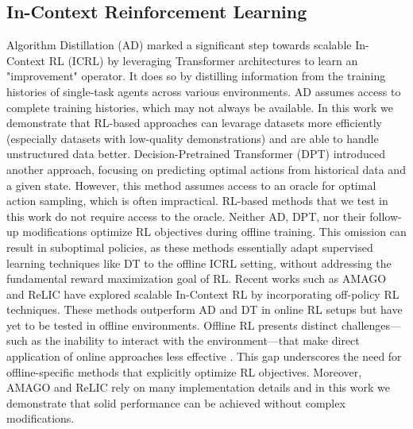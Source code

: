 \documentclass{article}
\begin{document}
\subsection{In-Context Reinforcement Learning}
Algorithm Distillation (AD) \citep{laskin2022context} marked a significant step towards scalable In-Context RL (ICRL) by leveraging Transformer architectures to learn an "improvement" operator. It does so by distilling information from the training histories of single-task agents across various environments. AD assumes access to complete training histories, which may not always be available. In this work we demonstrate that RL-based approaches can levarage datasets more efficiently (especially datasets with low-quality demonstrations) and are able to handle unstructured data better.
Decision-Pretrained Transformer (DPT) \citep{lee2024supervised} introduced another approach, focusing on predicting optimal actions from historical data and a given state. However, this method assumes access to an oracle for optimal action sampling, which is often impractical. RL-based methods that we test in this work do not require access to the oracle.
Neither AD, DPT, nor their follow-up modifications \citep{sinii2023context, schmied2024retrieval, dai2024context, huang2024context, sondistilling, zisman2024n} optimize RL objectives during offline training. This omission can result in suboptimal policies, as these methods essentially adapt supervised learning techniques like DT to the offline ICRL setting, without addressing the fundamental reward maximization goal of RL.
Recent works such as AMAGO \citep{grigsby2023amago} and ReLIC \citep{elawady2024relic} have explored scalable In-Context RL by incorporating off-policy RL techniques. These methods outperform AD and DT in online RL setups but have yet to be tested in offline environments. Offline RL presents distinct challenges—such as the inability to interact with the environment—that make direct application of online approaches less effective \citep{fujimoto2019off, levine2020offline}. This gap underscores the need for offline-specific methods that explicitly optimize RL objectives.  Moreover, AMAGO and ReLIC rely on many implementation details and in this work we demonstrate that solid performance can be achieved without complex modifications.
\end{document}
